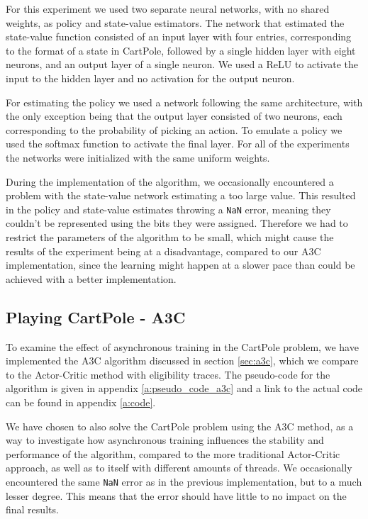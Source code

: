 \documentclass[11pt]{article}
\begin{document}
For this experiment we used two separate neural networks, with no
shared weights, as policy and state-value estimators.
The network that estimated the state-value function consisted of an
input layer with four entries, corresponding to the format of a state in CartPole,
followed by a single hidden layer with eight neurons, and an output layer of a single
neuron.
We used a ReLU to activate the input to the
hidden layer and no activation for the output neuron.

For estimating the policy we used a network following the same architecture,
with the only exception being that the output layer consisted of two
neurons, each corresponding to the probability of picking an action.
To emulate a policy we used the softmax function
to activate the final layer.
For all of the experiments the networks were initialized with the same uniform
weights.

During the implementation of the algorithm, we occasionally encountered a problem with the
state-value network estimating a too large value.
This resulted in the policy and state-value estimates throwing a \texttt{NaN} error,
meaning they couldn't be represented using the bits they were assigned.
Therefore we had to restrict the parameters of the algorithm to
be small, which might cause the results of the
experiment being at a disadvantage, compared to our A3C implementation, since the learning
might happen at a slower pace than could be achieved with a better implementation.

\subsection{Playing CartPole - A3C}

To examine the effect of asynchronous training in the CartPole problem,
we have implemented the A3C algorithm discussed in section \ref{sec:a3c},
which we compare to the Actor-Critic method with eligibility traces.
The pseudo-code for the algorithm is given in appendix \ref{a:pseudo_code_a3c}
and a link to the actual code can be found in appendix \ref{a:code}.

We have chosen to also solve the CartPole problem using the A3C method, as a way to
investigate how asynchronous training influences the stability and performance of the algorithm,
compared to the more traditional Actor-Critic approach, as well as 
to itself with different amounts of threads.
We occasionally encountered the same \texttt{NaN} error as in the previous implementation,
but to a much lesser degree.
This means that the error should have little to no impact on
the final results.
\end{document}
